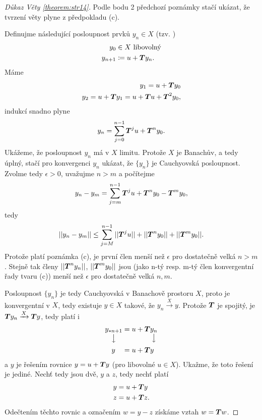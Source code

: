 \begin{proof}[Důkaz Věty \ref{theorem:str14}]
Podle bodu 2 předchozí poznámky stačí ukázat, že tvrzení věty plyne  z předpokladu (c).

Definujme následující posloupnost prvků $y_n\in X$ (tzv. )
\begin{equation*}
    \begin{split}
    y_0&\in X \text{ libovolný}\\
    y_{n+1}&\coloneqq u+ \boldsymbol{T} y_n.
    \end{split}
\end{equation*}
Máme 
\begin{equation*}
    \begin{split}
    y_1=u+ \boldsymbol{T} y_0\\
    y_2=u+ \boldsymbol{T} y_1=u+ \boldsymbol{T} u+ \boldsymbol{T} ^2y_0,
    \end{split}
\end{equation*}
indukcí snadno plyne
\begin{equation}
    y_n=\sum\limits_{j=0}^{n-1} \boldsymbol{T} ^ju+ \boldsymbol{T} ^ny_0.    \label{eq:yn_suma}
\end{equation}
Ukážeme, že posloupnost $y_n$ má v $X$ limitu. Protože $X$ je Banachův, a tedy úplný, stačí pro konvergenci $y_n$ ukázat, že $\{y_n\}$ je Cauchyovská posloupnost. Zvolme tedy $\epsilon>0$, uvažujme $n>m$ a počítejme
$$y_n-y_m=\sum\limits_{j=m}^{n-1} \boldsymbol{T} ^ju+ \boldsymbol{T} ^ny_0- \boldsymbol{T} ^my_0,$$
tedy $$||y_n-y_m||\leq \sum\limits_{j=M}^{n-1}|| \boldsymbol{T} ^ju||+|| \boldsymbol{T} ^ny_0||+|| \boldsymbol{T} ^my_0||.$$
Protože platí poznámka (c), je první člen menší než $\epsilon$ pro dostatečně velká $n>m$. Stejně tak členy $|| \boldsymbol{T} ^ny_n||$, $|| \boldsymbol{T} ^my_0||$ jsou (jako n-tý resp. m-tý člen konvergentní řady tvaru (c)) menší než $\epsilon$ pro dostatečně velká $n,m$. 

Posloupnost $\{y_n\}$ je tedy Cauchyovská v Banachově prostoru $X$, proto je konvergentní v $X$, tedy existuje $y\in X$ takové, že $y_n\xrightarrow{X} y$. Protože $ \boldsymbol{T} $ je spojitý, je $ \boldsymbol{T} y_n\xrightarrow{X} \boldsymbol{T} y$, tedy platí i 
\begin{equation*}
    \begin{split}
        \underset{\big\downarrow}{y_{*n+1}}&=u+ \boldsymbol{T} \underset{\big\downarrow }{y_n}\\
        y\quad&=u+ \boldsymbol{T} y
    \end{split}
\end{equation*}
a $y$ je řešením rovnice $y=u+ \boldsymbol{T} y$ (pro libovolné $u\in X$). Ukažme, že toto řešení je jediné. Nechť tedy jsou dvě, $y$ a $z$, tedy nechť platí 
\begin{equation*}
    \begin{split}
        y&=u+ \boldsymbol{T} y\\
        z&=u+ \boldsymbol{T} z.
    \end{split}
\end{equation*}
Odečtením těchto rovnic a označením $w=y-z$ získáme vztah $w= \boldsymbol{T} w$. 


\end{proof}
